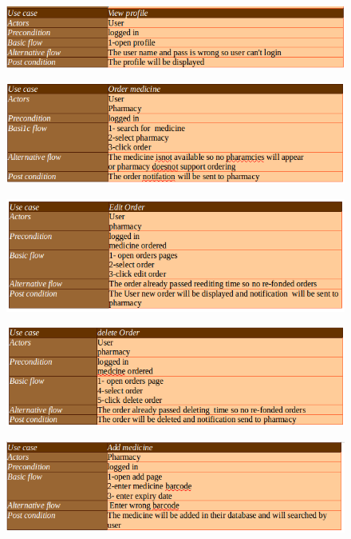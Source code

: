\documentclass[]{article}
\begin{document}
\begin{figure}[H]
\centering
\includegraphics[scale=0.4]{./scenario/17}
\end{figure}
\begin{figure}[H]
\centering
\includegraphics[scale=0.4]{./scenario/18}
\end{figure}
\begin{figure}[H]
\centering
\includegraphics[scale=0.4]{./scenario/19}
\end{figure}
\begin{figure}[H]
\centering
\includegraphics[scale=0.4]{./scenario/20}
\end{figure}
\begin{figure}[H]
\centering
\includegraphics[scale=0.4]{./scenario/21}
\end{figure}
\end{document}

